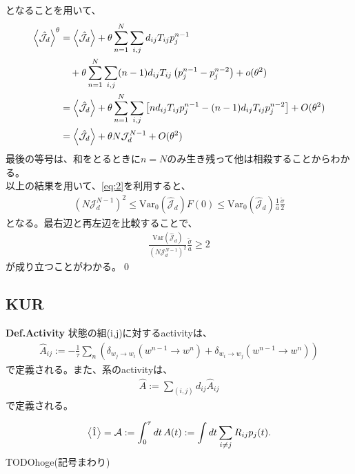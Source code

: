 \documentclass[a4paper,11pt]{jsarticle}
\numberwithin{equation}{section}
\begin{document}
となることを用いて、
\begin{align}
    \expval{\hat{\mathcal{J}}_d}^\theta 
    &= \expval{\hat{\mathcal{J}}_d} + \theta \sum_{n=1}^{N} \sum_{i,j} d_{ij} T_{ij} p_j^{n-1} \nonumber \\
    &\quad + \theta \sum_{n=1}^{N} \sum_{i,j} (n-1) d_{ij} T_{ij} \left(p_j^{n-1} - p_j^{n-2}\right) + o(\theta^2) \\
    &= \expval{\hat{\mathcal{J}}_d} + \theta \sum_{n=1}^{N} \sum_{i,j} \left[ n d_{ij} T_{ij} p_j^{n-1} - (n-1) d_{ij} T_{ij} p_j^{n-2} \right] + O(\theta^2) \\
    &= \expval{\hat{\mathcal{J}}_d} + \theta N \mathcal{J}_d^{N-1} + O(\theta^2)
\end{align}
最後の等号は、和をとるときに$n=N$のみ生き残って他は相殺することからわかる。\\

以上の結果を用いて、\eqref{eq:2}を利用すると、
\begin{align}
    (N \mathcal{J}_d^{N-1})^2 \leq \text{Var}_0(\hat{\mathcal{J}}_d) F(0) \leq \text{Var}_0(\hat{\mathcal{J}}_d) \frac{1}{a} \frac{\tilde{\sigma}}{2}
\end{align}
となる。最右辺と再左辺を比較することで、
\begin{align}
    \frac{\text{Var}(\hat{\mathcal{J}}_d)}{(N \mathcal{J}_d^{N-1})^2} \frac{\tilde{\sigma}}{a} \geq 2
\end{align}
が成り立つことがわかる。\qed

\subsection{KUR}

\begin{itembox}[l]{\textbf{Def.Activity}}
    状態の組(i,j)に対するactivityは、
    \begin{align}
        \hat{A}_{ij} := -\frac{1}{\tau} \sum_{n} \left( 
    \delta_{w_j \to w_i}(w^{n-1} \to w^n) + \delta_{w_i \to w_j}(w^{n-1} \to w^n) 
    \right)
    \end{align}
    で定義される。また、系のactivityは、
    \begin{align}
        \hat{A} := \sum_{(i,j)} d_{ij} \hat{A}_{ij}
    \end{align}
    で定義される。
\end{itembox}

\begin{align}
    \expval{\hat{1}} = \mathcal{A} := \int_{0}^{\tau} dt \, A(t) := \int dt \sum_{i \neq j} R_{ij} p_j(t).
\end{align}
TODOhoge(記号まわり)
\end{document}
